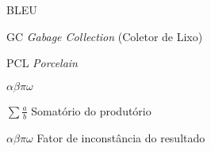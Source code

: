 \documentclass[cic,tc]{iiufrgs}
\begin{document}
\begin{listofabbrv}{BLEU}
    \item[GC] \emph{Gabage Collection} (Coletor de Lixo)
    \item[PCL] \emph{Porcelain}
\end{listofabbrv}

\begin{listofsymbols}{$\alpha\beta\pi\omega$}
    \item[$\sum{\frac{a}{b}}$] Somatório do produtório
    \item[$\alpha\beta\pi\omega$] Fator de inconstância do resultado
\end{listofsymbols}

\tableofcontents











%



\end{document}
